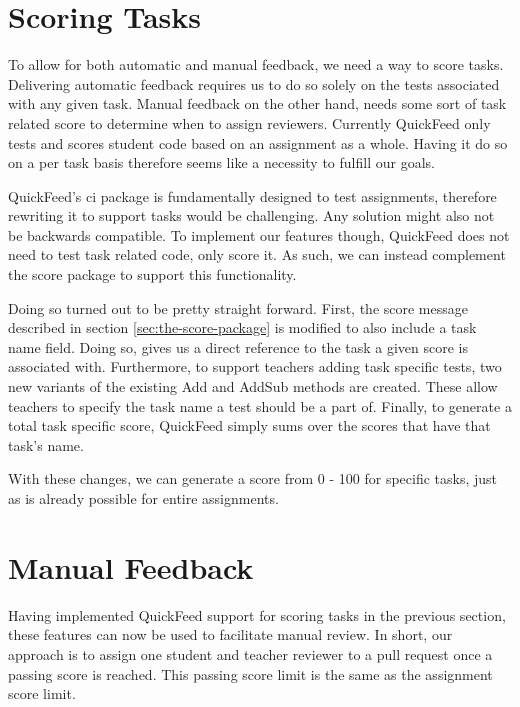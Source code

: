 \section{Scoring Tasks}

To allow for both automatic and manual feedback, we need a way to score tasks.
Delivering automatic feedback requires us to do so solely on the tests associated with any given task.
Manual feedback on the other hand, needs some sort of task related score to determine when to assign reviewers.
Currently QuickFeed only tests and scores student code based on an assignment as a whole.
Having it do so on a per task basis therefore seems like a necessity to fulfill our goals.

QuickFeed's ci package is fundamentally designed to test assignments, therefore rewriting it to support tasks would be challenging.
Any solution might also not be backwards compatible.
To implement our features though, QuickFeed does not need to test task related code, only score it.
As such, we can instead complement the score package to support this functionality.

Doing so turned out to be pretty straight forward.
First, the score message described in section \ref{sec:the-score-package} is modified to also include a task name field.
Doing so, gives us a direct reference to the task a given score is associated with.
Furthermore, to support teachers adding task specific tests, two new variants of the existing Add and AddSub methods are created.
These allow teachers to specify the task name a test should be a part of.
Finally, to generate a total task specific score, QuickFeed simply sums over the scores that have that task's name.

With these changes, we can generate a score from 0 - 100 for specific tasks, just as is already possible for entire assignments.

\section{Manual Feedback}

Having implemented QuickFeed support for scoring tasks in the previous section, these features can now be used to facilitate manual review.
In short, our approach is to assign one student and teacher reviewer to a pull request once a passing score is reached.
This passing score limit is the same as the assignment score limit.

